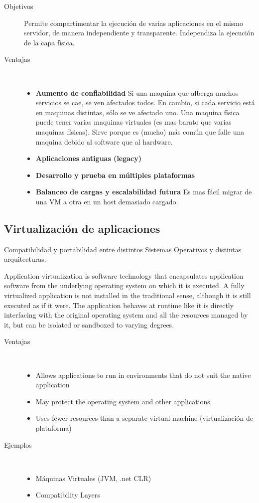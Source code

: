 \documentclass[a4paper, twoside]{article}
\begin{document}
\begin{description}
	\item[Objetivos] Permite compartimentar la ejecución de varias aplicaciones en el mismo servidor, de manera independiente y transparente. Independiza la ejecución de la capa física.

	\item[Ventajas] ~
	\begin{itemize}
		\item \textbf{Aumento de confiabilidad} Si una maquina que alberga muchos servicios se cae, se ven afectados todos. En cambio, si cada servicio está en maquinas distintas, sólo se ve afectado uno. Una maquina física puede tener varias maquinas virtuales (es mas barato que varias maquinas físicas). Sirve porque es (mucho) más común que falle una maquina debido al software que al hardware.
		\item \textbf{Aplicaciones antiguas (legacy)}
		\item \textbf{Desarrollo y prueba en múltiples plataformas}
		\item \textbf{Balanceo de cargas y escalabilidad futura} Es mas fácil migrar de una VM a otra en un host demasiado cargado.	
	\end{itemize}
\end{description}

\subsection{Virtualización de aplicaciones}
Compatibilidad y portabilidad entre distintos Sistemas Operativos y distintas arquitecturas.

Application virtualization is software technology that encapsulates application software from the underlying operating system on which it is executed. A fully virtualized application is not installed in the traditional sense, although it is still executed as if it were. The application behaves at runtime like it is directly interfacing with the original operating system and all the resources managed by it, but can be isolated or sandboxed to varying degrees.

\begin{description}
	\item[Ventajas] ~
	\begin{itemize}
		\item Allows applications to run in environments that do not suit the native application
		\item May protect the operating system and other applications
		\item Uses fewer resources than a separate virtual machine (virtualización de plataforma)
	\end{itemize}

	\item[Ejemplos] ~
	\begin{itemize}
		\item Máquinas Virtuales (JVM, .net CLR)
		\item Compatibility Layers
	\end{itemize}
\end{description}
\end{document}
